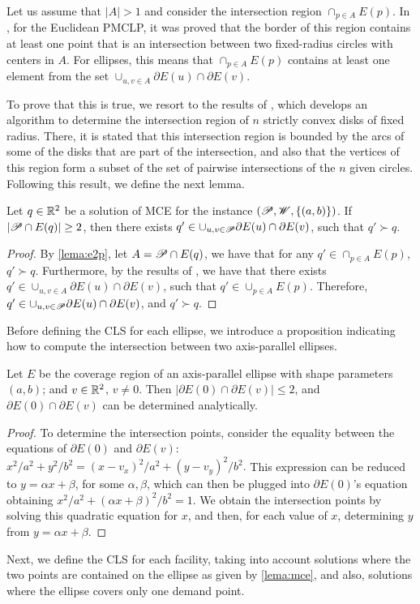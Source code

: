 Let us assume that $|A|>1$ and consider the intersection region $\cap_{p\in A} E(p)$. 
In \cite{church:1984}, for the Euclidean PMCLP, it was proved that the border of this region contains at least one point that is an intersection between two fixed-radius circles with centers in $A$. For ellipses, this means that $ \cap_{p\in A} E(p)$ contains at least one element from the set $\cup_{u, v \in A}\partial E(u) \cap \partial E(v)$. 

To prove that this is true, we resort to the results of \cite{bi}, which develops an algorithm to determine the intersection region of $n$ strictly convex disks of fixed radius. There, it is stated that this intersection region is bounded by the arcs of some of the disks that are part of the intersection, and also that the vertices of this region form a subset of the set of pairwise intersections of the $n$ given circles.
Following this result, we define the next lemma.

\begin{lem}\label{lema:mce}
	Let $q\in \mathbb{R}^2$ be a solution of MCE for the instance $(\mathscr{P}, \mathscr{W}, \{(a, b)\})$.
	If $|\mathscr{P} \cap E(q)|\ge 2$, then there exists $q' \in \cup_{u, v \in \mathscr{P}}\partial E(u) \cap \partial E(v)$, such that $q' \succ q$.
\end{lem}
\begin{proof}
	By \autoref{lema:e2p}, let $A=\mathscr{P} \cap E(q)$, we have that for any $q' \in \cap_{p\in A} E(p)$, $q' \succ q$. 
	Furthermore, by the results of \cite{bi}, we have that there exists $q' \in \cup_{u, v \in A}\partial E(u) \cap \partial E(v)$, such that $q' \in \cup_{p\in A} E(p)$. 
	Therefore, $q' \in \cup_{u, v \in \mathscr{P}}\partial E(u) \cap \partial E(v)$, and $q' \succ q$.
\end{proof}

Before defining the CLS for each ellipse, we introduce a proposition indicating how to compute the intersection between two axis-parallel ellipses.

\begin{prp}\label{lema:e2p}
	Let $E$ be the coverage region of an axis-parallel ellipse with shape parameters $(a,b)$; and $v \in \mathbb{R}^2$, $v\neq0$. Then $|\partial E(0) \cap \partial E(v)| \le 2$, and $\partial E(0) \cap \partial E(v)$ can be determined analytically.
\end{prp}

\begin{proof}
	To determine the intersection points, consider the equality between the equations of $\partial E(0)$ and $\partial E(v)$:
	$x^2/a^2 + y^2/b^2 = (x-v_x)^2/a^2 + (y-v_y)^2/b^2.$
	This expression can be reduced to $y=\alpha x + \beta$, for some $\alpha, \beta$, which can then be plugged into $\partial E(0)$'s equation obtaining $x^2/a^2 + (\alpha x + \beta)^2/b^2 = 1$.
	We obtain the intersection points by solving this quadratic equation for $x$, and then, for each value of $x$,  determining $y$ from $y=\alpha x + \beta$.
\end{proof}
Next, we define the CLS for each facility, taking into account solutions where the two points are contained on the ellipse as given by \autoref{lema:mce}, and also, solutions where the ellipse covers only one demand point.

